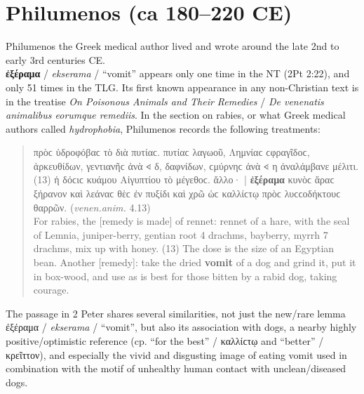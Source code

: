 %
%
\chapter{Philumenos (ca 180--220 CE)}
\vspace*{3mm}%
\justifying%
%
\noindent{}Philumenos the Greek medical author lived and wrote around the late 2nd to early 3rd centuries CE. \\[2mm] %

\noindent{}\textbf{ἐξέραμα} / \textit{ekserama} / “vomit” appears only one time in the NT (2Pt 2:22), %
and only 51 times in the TLG. %
Its first known appearance in any non-Christian text is in the treatise %
\textit{On Poisonous Animals and Their Remedies} / \textit{De venenatis animalibus eorumque remediis}. %
In the section on rabies, or what Greek medical authors called \textit{hydrophobia}, %
Philumenos records the following treatments: %

\vspace*{3mm} 
 \begin{quote}πρὸϲ ὑδροφόβαϲ τὸ διὰ πυτίαϲ. πυτίαϲ λαγωοῦ, Λημνίαϲ ϲφραγῖδοϲ, 
 ἀρκευθίδων, γεντιανῆϲ ἀνὰ {\greeksymbol 𐅻} δ, δαφνίδων, %
 ϲμύρνηϲ ἀνὰ {\greeksymbol 𐅻} η ἀναλάμβανε μέλιτι. %
 (13) ἡ δόϲιϲ κυάμου Αἰγυπτίου τὸ μέγεθοϲ. %
  ἄλλο· | \textbf{ἐξέραμα} κυνὸϲ ἄραϲ ξήρανον καὶ λεάναϲ θὲϲ ἐν πυξίδι %
  καὶ χρῶ ὡϲ καλλίϲτῳ πρὸϲ λυϲϲοδήκτουϲ θαρρῶν. (\textit{venen.anim.} 4.13)\\[1mm] %
 For rabies, the [remedy is made] of rennet: %
 rennet of a hare, with the seal of Lemnia, %
 juniper-berry, gentian root 4 drachms, bayberry, %
 myrrh 7 drachms, mix up with honey. %
 (13) The dose is the size of an Egyptian bean. %
 Another [remedy]: take the dried \textbf{vomit} of a dog and grind it, %
 put it in box-wood, and use as is best for those bitten by a rabid dog, %
 taking courage. %
 \end{quote} %
 \vspace*{3mm}

\noindent{}The passage in 2 Peter shares several similarities, %
not just the new/rare lemma ἐξέραμα / \textit{ekserama} / “vomit”, %
but also its association with dogs, a nearby highly positive/optimistic reference %
(cp. “for the best” / καλ\-λίϲτῳ and “better” / κρεῖττον), %
and especially the vivid and disgusting image of eating vomit %
used in combination with the motif of unhealthy human contact with unclean/diseased dogs. %

